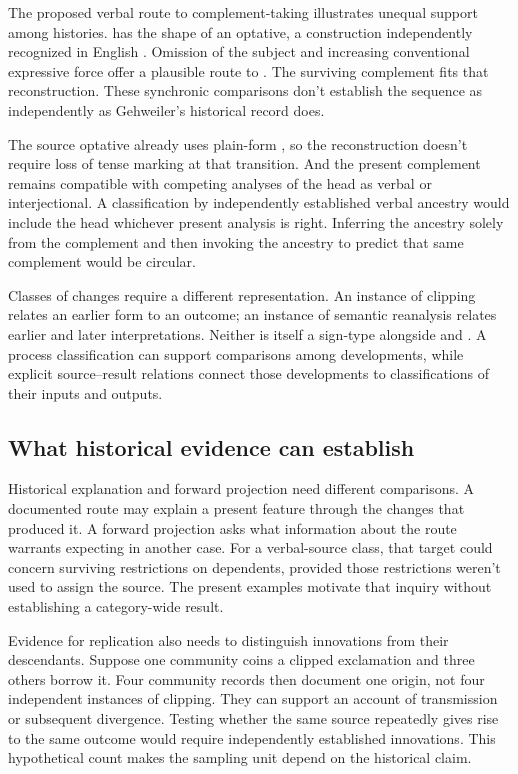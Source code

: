 \documentclass[12pt]{article}
\begin{document}
The proposed verbal route to complement-taking  illustrates
unequal support among histories.  has the shape
of an optative, a construction independently recognized in English
\citep[944]{HuddlestonPullum2002}. Omission of the subject and increasing
conventional expressive force offer a plausible route to . The surviving complement fits that reconstruction. These synchronic
comparisons don't establish the sequence as independently as Gehweiler's
historical record does.

The source optative already uses plain-form , so the
reconstruction doesn't require loss of tense marking at that transition.
And the present complement remains compatible with competing analyses
of the head as verbal or interjectional. A classification by independently
established verbal ancestry would include the head whichever present
analysis is right.
Inferring the ancestry solely from the complement and then invoking
the ancestry to predict that same complement would be circular.

Classes of changes require a different representation. An instance of
clipping relates an earlier form to an outcome; an instance of semantic
reanalysis relates earlier and later interpretations. Neither is itself
a sign-type alongside  and . A process
classification can support comparisons among developments, while explicit
source--result relations connect those developments to classifications
of their inputs and outputs.

\subsection{What historical evidence can establish}

Historical explanation and forward projection need different comparisons.
A documented route may explain a present feature through the changes
that produced it. A forward projection asks what information about the
route warrants expecting in another case. For a verbal-source class,
that target could concern surviving restrictions on dependents, provided
those restrictions weren't used to assign the source. The present
examples motivate that inquiry without establishing a category-wide result.

Evidence for replication also needs to distinguish innovations from their
descendants. Suppose one community coins a clipped exclamation and
three others borrow it. Four community records then document one
origin, not four independent instances of clipping. They can support
an account of transmission or subsequent divergence. Testing whether
the same source repeatedly gives rise to the same outcome would
require independently established innovations. This hypothetical count
makes the sampling unit depend on the historical claim.
\end{document}
